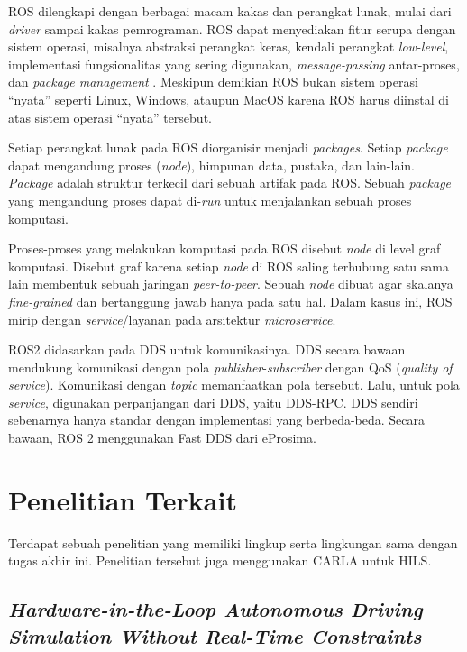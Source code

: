 ROS dilengkapi dengan berbagai macam kakas dan perangkat lunak, mulai dari
\textit{driver} sampai kakas pemrograman. ROS dapat menyediakan fitur serupa
dengan sistem operasi, misalnya abstraksi perangkat keras, kendali perangkat
\textit{low-level}, implementasi fungsionalitas yang sering digunakan,
\textit{message-passing} antar-proses, dan \textit{package management}
\parencite{x_rosIntro}.  Meskipun demikian ROS bukan sistem operasi ``nyata''
seperti Linux, Windows, ataupun MacOS karena ROS harus diinstal di atas sistem
operasi ``nyata'' tersebut.

Setiap perangkat lunak pada ROS diorganisir menjadi \textit{packages}. Setiap
\textit{package} dapat mengandung proses (\textit{node}), himpunan data,
pustaka, dan lain-lain. \textit{Package} adalah struktur terkecil dari sebuah
artifak pada ROS. Sebuah \textit{package} yang mengandung proses dapat
di-\textit{run} untuk menjalankan sebuah proses komputasi.

Proses-proses yang melakukan komputasi pada ROS disebut \textit{node} di level
graf komputasi. Disebut graf karena setiap \textit{node} di ROS saling terhubung
satu sama lain membentuk sebuah jaringan \textit{peer-to-peer}. Sebuah
\textit{node} dibuat agar skalanya \textit{fine-grained} dan bertanggung jawab
hanya pada satu hal. Dalam kasus ini, ROS mirip dengan \textit{service}/layanan
pada arsitektur \textit{microservice}.

ROS2 didasarkan pada DDS untuk komunikasinya. DDS secara bawaan mendukung
komunikasi dengan pola \textit{publisher}-\textit{subscriber} dengan QoS
(\textit{quality of service}). Komunikasi dengan \textit{topic} memanfaatkan
pola tersebut. Lalu, untuk pola \textit{service}, digunakan perpanjangan dari
DDS, yaitu DDS-RPC. DDS sendiri sebenarnya hanya standar dengan implementasi
yang berbeda-beda. Secara bawaan, ROS 2 menggunakan Fast DDS dari eProsima.

\section{Penelitian Terkait}

Terdapat sebuah penelitian yang memiliki lingkup serta lingkungan sama dengan
tugas akhir ini. Penelitian tersebut juga menggunakan CARLA untuk HILS.

\subsection{\textit{Hardware-in-the-Loop Autonomous Driving Simulation Without
		Real-Time Constraints}}

